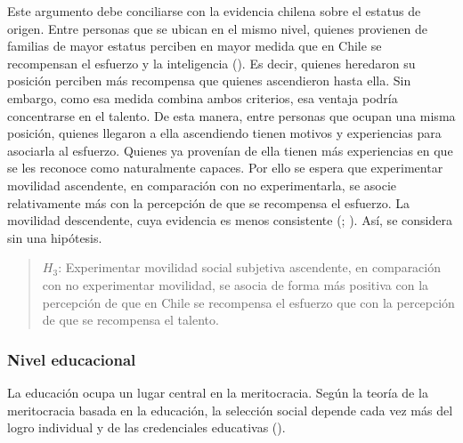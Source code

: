 \documentclass[
  spanish,
  a4paper,
  oneside]{scrbook}
\begin{document}
Este argumento debe conciliarse con la evidencia chilena sobre el
estatus de origen. Entre personas que se ubican en el mismo nivel,
quienes provienen de familias de mayor estatus perciben en mayor medida
que en Chile se recompensan el esfuerzo y la inteligencia
(). Es decir, quienes heredaron su posición perciben más recompensa
que quienes ascendieron hasta ella. Sin embargo, como esa medida combina
ambos criterios, esa ventaja podría concentrarse en el talento. De esta
manera, entre personas que ocupan una misma posición, quienes llegaron a
ella ascendiendo tienen motivos y experiencias para asociarla al
esfuerzo. Quienes ya provenían de ella tienen más experiencias en que se
les reconoce como naturalmente capaces. Por ello se espera que
experimentar movilidad ascendente, en comparación con no experimentarla,
se asocie relativamente más con la percepción de que se recompensa el
esfuerzo. La movilidad descendente, cuya evidencia es menos consistente
(;
). Así, se considera sin una hipótesis.

\begin{quote}
\(H_3\): Experimentar movilidad social subjetiva ascendente, en
comparación con no experimentar movilidad, se asocia de forma más
positiva con la percepción de que en Chile se recompensa el esfuerzo que
con la percepción de que se recompensa el talento.
\end{quote}

\subsubsection{Nivel educacional}\label{nivel-educacional-1}

La educación ocupa un lugar central en la meritocracia. Según la teoría
de la meritocracia basada en la educación, la selección social depende
cada vez más del logro individual y de las credenciales educativas
().
\end{document}
